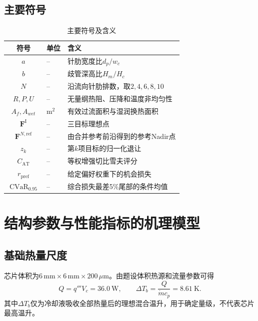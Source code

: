 \documentclass[UTF8,12pt,a4paper]{ctexart}
\newcommand{\mdotf}{\dot m}
\newcommand{\CVaR}{\operatorname{CVaR}}
\begin{document}
\subsection{主要符号}
\begin{table}[H]\centering\small
\caption{主要符号及含义}
\begin{tabularx}{\textwidth}{clX}
\toprule
符号&单位&含义\\\midrule
$a$&--&针肋宽度比$d_p/w_c$\\
$b$&--&歧管深高比$H_m/H_c$\\
$N$&--&沿流向针肋排数，取$2,4,6,8,10$\\
$R,P,U$&--&无量纲热阻、压降和温度非均匀性\\
$A_f,A_{wet}$&$\mathrm{m^2}$&有效过流面积与湿润换热面积\\
$\bm F^{\mathrm I}$&--&三目标理想点\\
$\bm F^{N,\mathrm{ref}}$&--&由合并参考前沿得到的参考Nadir点\\
$z_k$&--&第$k$项目标的归一化退让\\
$C_{\mathrm{AT}}$&--&等权增强切比雪夫评分\\
$r_{\mathrm{pref}}$&--&给定偏好权重下的机会损失\\
$\CVaR_{0.95}$&--&综合损失最差5\%尾部的条件均值\\
\bottomrule
\end{tabularx}
\end{table}

\section{结构参数与性能指标的机理模型}

\subsection{基础热量尺度}
芯片体积为$6\,\mathrm{mm}\times6\,\mathrm{mm}\times200\,\mu\mathrm m$。由题设体积热源和流量参数可得
\begin{equation}
Q=q'''V_c=36.0\ \mathrm W,\qquad
\Delta T_b=\frac{Q}{\mdotf c_p}=8.61\ \mathrm K.
\end{equation}
其中$\Delta T_b$仅为冷却液吸收全部热量后的理想混合温升，用于确定量级，不代表芯片最高温升。
\end{document}
